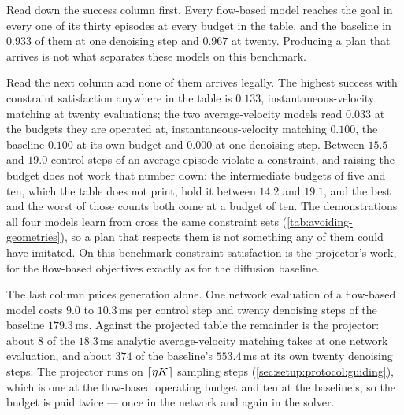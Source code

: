 Read down the success column first. Every flow-based model reaches the goal in every one of its thirty
episodes at every budget in the table, and the baseline in $0.933$ of them at one denoising step and
$0.967$ at twenty. Producing a plan that arrives is not what separates these models on this benchmark.

Read the next column and none of them arrives legally. The highest success with constraint satisfaction
anywhere in the table is $0.133$, instantaneous-velocity matching at twenty evaluations; the two
average-velocity models read $0.033$ at the budgets they are operated at, instantaneous-velocity
matching $0.100$, the baseline $0.100$ at its own budget and $0.000$ at one denoising step. Between
$15.5$ and $19.0$ control steps of an average episode violate a constraint, and raising the budget does
not work that number down: the intermediate budgets of five and ten, which the table does not print,
hold it between $14.2$ and $19.1$, and the best and the worst of those counts both come at a budget of ten.
The demonstrations all four models learn from cross the
same constraint sets (\autoref{tab:avoiding-geometries}), so a plan that respects them is not something
any of them could have imitated. On this benchmark constraint satisfaction is the projector's work, for
the flow-based objectives exactly as for the diffusion baseline.

The last column prices generation alone. One network evaluation of a flow-based model costs $9.0$ to
$10.3$\,ms per control step and twenty denoising steps of the baseline $179.3$\,ms. Against the projected
table the remainder is the projector: about $8$ of the $18.3$\,ms analytic average-velocity matching
takes at one network evaluation, and about $374$ of the baseline's $553.4$\,ms at its own twenty
denoising steps. The projector runs on
$\lceil \eta K \rceil$ sampling steps (\autoref{sec:setup:protocol:guiding}), which is one at the
flow-based operating budget and ten at the baseline's, so the budget is paid twice --- once in the
network and again in the solver.

